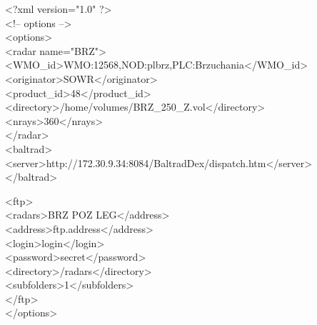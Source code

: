 \documentclass[11p]{article}
\begin{document}
\begin{kod}
<?xml version="1.0" ?>\\
<!-- options -->\\
<options>\\
\hspace*{0.5cm}<radar name="BRZ">\\
\hspace*{1cm}<WMO\_id>WMO:12568,NOD:plbrz,PLC:Brzuchania</WMO\_id>\\
\hspace*{1cm}<originator>SOWR</originator>\\
\hspace*{1cm}<product\_id>48</product\_id>\\
\hspace*{1cm}<directory>/home/volumes/BRZ\_250\_Z.vol</directory>\\
\hspace*{1cm}<nrays>360</nrays>\\
\hspace*{0.5cm}</radar>\\
\hspace*{0.5cm}<baltrad>\\
\hspace*{1cm}<server>http://172.30.9.34:8084/BaltradDex/dispatch.htm</server>\\
\hspace*{0.5cm}</baltrad>\\
\end{kod}
\begin{kod}
\hspace*{0.5cm}<ftp>\\
\hspace*{1cm}<radars>BRZ POZ LEG</address>\\
\hspace*{1cm}<address>ftp.address</address>\\
\hspace*{1cm}<login>login</login>\\
\hspace*{1cm}<password>secret</password>\\
\hspace*{1cm}<directory>/radars</directory>\\
\hspace*{1cm}<subfolders>1</subfolders>\\
\hspace*{0.5cm}</ftp>\\
</options>
\end{kod}
\end{document}
